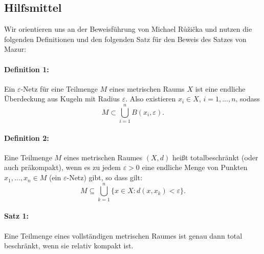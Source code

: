 \documentclass[a4paper,fontsize=8pt,DIV=1]{article}
\theoremstyle{plain}
\begin{document}
\subsection*{Hilfsmittel}
Wir orientieren uns an der Beweisführung von Michael Růžička und nutzen die folgenden Definitionen und den folgenden Satz für den Beweis des Satzes von Mazur:

\paragraph*{Definition 1:}
Ein $\varepsilon$-Netz für eine Teilmenge $M$ eines metrischen Raums $X$ ist eine endliche Überdeckung aus Kugeln mit Radius $\varepsilon$. Also existieren $x_i \in X$, $i = 1,...,n$, sodass
\begin{equation}
M \subset \bigcup_{i=1}^n B(x_i, \varepsilon).
\end{equation}

\paragraph*{Definition 2:}
Eine Teilmenge $M$ eines metrischen Raumes $(X,d)$ heißt totalbeschränkt (oder auch präkompakt), wenn es zu jedem $\varepsilon > 0$ eine endliche Menge von Punkten $x_{1},\ldots ,x_{n}\in M$ (ein $\varepsilon$-Netz) gibt, so dass gilt: 
\begin{equation}
M\subseteq \bigcup _{k=1}^{n}\{x\in X:d(x,x_{k})<\varepsilon \}.
\end{equation}

\paragraph*{Satz 1:}
Eine Teilmenge eines vollständigen metrischen Raumes ist genau dann total beschränkt, wenn sie relativ kompakt ist.
\end{document}
